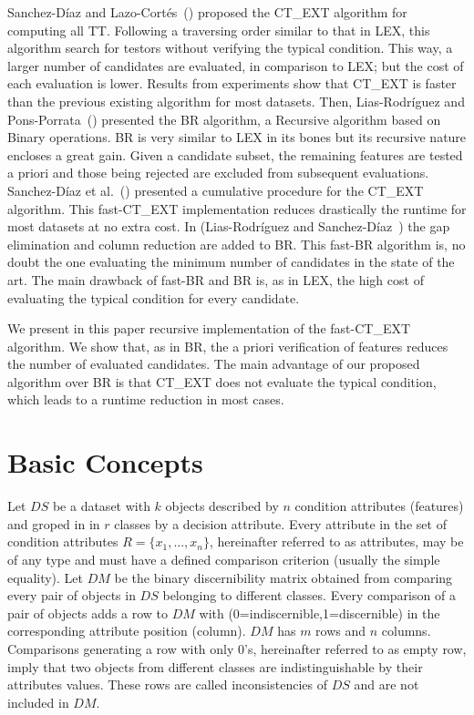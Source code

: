 \documentclass[citeauthoryear]{llncs}
\begin{document}
	Sanchez-D\'iaz and Lazo-Cort\'es~(\cite{Sanchez2007}) proposed the CT\_EXT algorithm for computing all
	TT. Following a traversing order similar to that in LEX, this algorithm search for
	testors without verifying the typical condition. This way, a larger number of candidates are 
	evaluated, in comparison to LEX; but the cost of each evaluation is lower. Results from experiments
	show that CT\_EXT is faster than the previous existing algorithm for most datasets. Then, Lias-Rodr\'iguez
	and Pons-Porrata~(\cite{Lias2009}) presented the BR algorithm, a Recursive algorithm based on 
	Binary operations. BR is very similar to LEX in its bones but its recursive nature encloses a great
	gain. Given a candidate subset, the remaining features are tested a priori and those being rejected are
	excluded from subsequent evaluations. Sanchez-D\'iaz et al.~(\cite{Sanchez2010}) presented a cumulative
	procedure for the CT\_EXT algorithm. This fast-CT\_EXT implementation reduces drastically the runtime
	for most datasets at no extra cost. In (Lias-Rodr\'iguez and Sanchez-D\'iaz~\cite{Lias2013}) the
	gap elimination and column reduction are added to BR. This fast-BR algorithm is, no doubt the one 
	evaluating the minimum number of candidates in the state of the art. The main drawback of fast-BR and 
	BR is, as in LEX, the high cost of evaluating the typical condition for every candidate. 
	
	We present in this paper recursive implementation of the fast-CT\_EXT algorithm. We show that, as 
	in BR, the a priori verification of features reduces the number of evaluated candidates. The main
	advantage of our proposed algorithm over BR is that CT\_EXT does not evaluate the typical condition,
	which leads to a runtime reduction in most cases.	
%
\section{Basic Concepts}
%
	Let $DS$ be a dataset with $k$ objects described by $n$ condition attributes (features) and groped in
	in $r$ classes by a decision attribute. Every attribute in the set of condition attributes 
	$R=\lbrace x_1,...,x_n \rbrace$, hereinafter referred to as attributes, may be of any type and must
	have a defined comparison criterion (usually the simple equality). Let $DM$ be the binary discernibility
	matrix obtained from comparing every pair of objects in $DS$ belonging to different classes. Every 
	comparison of a pair of objects adds a row to $DM$ with (0=indiscernible,1=discernible) in the corresponding 
	attribute position (column). $DM$ has $m$ rows and $n$ columns. Comparisons generating a row with only 
	0's, hereinafter referred to as empty row, imply that two objects from different classes are indistinguishable 
	by their attributes values. These rows are called inconsistencies of $DS$ and are not included in $DM$.
	
\end{document}
